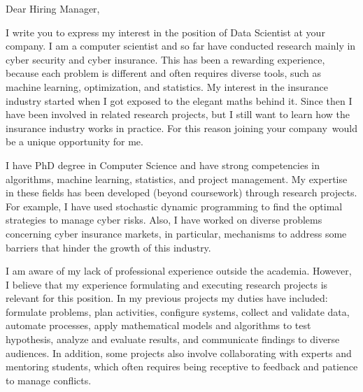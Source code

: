 \documentclass[letter,10pt]{letter}
\newcommand{\position}{Data Scientist }
\newcommand{\place}{your company}
\begin{document}
\begin{letter}{
}
 
\opening{Dear Hiring Manager,}

I write you to express my interest in the position of \position  at \place.
I am a computer scientist and so far have conducted research mainly in cyber security and cyber insurance. This has been a rewarding experience, because each problem is different and often requires diverse tools, such as machine learning, optimization, and statistics. 
My interest in the insurance industry started when I got exposed to the elegant maths behind it. Since then I have been involved in related research projects, but I still want to learn how the insurance industry works in practice. For this reason joining \place \ would be a unique opportunity for me.



I have PhD degree in Computer Science 
and have strong competencies in algorithms, machine learning, statistics, and project management. My expertise in these fields has been developed (beyond coursework) through research projects. 
For example, I have used stochastic dynamic programming to find the optimal strategies to manage cyber risks. 
Also, I have worked on diverse problems concerning cyber insurance markets, in particular, mechanisms to address
some barriers that hinder the growth of this industry. 



I am aware of my lack of professional experience outside the academia. However, I believe that my experience formulating and executing research projects is relevant for this position. In my previous projects my duties have included: formulate problems, plan activities, configure systems, collect and validate data, automate processes, apply mathematical models and algorithms to test hypothesis, analyze and evaluate results,  and communicate findings to diverse audiences. In addition, some projects also involve collaborating with experts and mentoring students, which often requires being receptive to feedback and patience to manage conflicts.



\end{letter}
\end{document}
